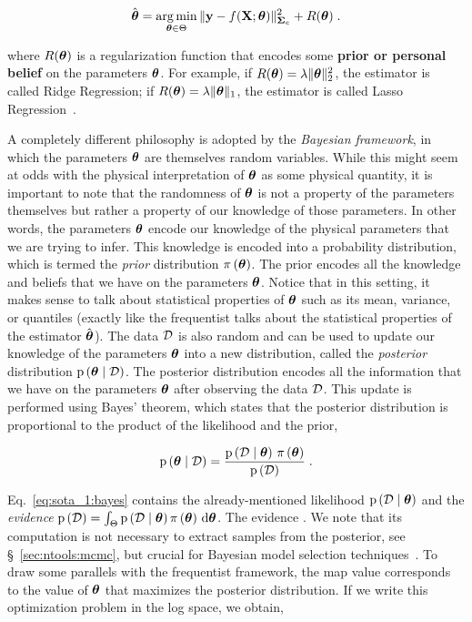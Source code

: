 \begin{equation}
    \hat{\boldsymbol{\theta}} = \operatorname*{arg\,min}_{\boldsymbol{\theta} \in \Theta} \|\mathbf{y} - f(\mathbf{X};\boldsymbol{\theta})\|_{\boldsymbol{\Sigma}_e}^2 + R(\boldsymbol{\theta}) \;.
    \label{eq:sota_1:regularized_ols}
\end{equation}

where $R(\boldsymbol{\theta})$ is a regularization function that encodes some \textbf{prior or personal belief} on the parameters $\boldsymbol{\theta}$. For example, if $R(\boldsymbol{\theta}) = \lambda \|\boldsymbol{\theta}\|_2^2$, the estimator is called Ridge Regression; if $R(\boldsymbol{\theta}) = \lambda \|\boldsymbol{\theta}\|_1$, the estimator is called Lasso Regression~\cite{BEDOUI2020106917}.

\bigskip
A completely different philosophy is adopted by the \textit{Bayesian framework}, in which the parameters $\boldsymbol{\theta}$ are themselves random variables. While this might seem at odds with the physical interpretation of $\boldsymbol{\theta}$ as some physical quantity, it is important to note that the randomness of $\boldsymbol{\theta}$ is not a property of the parameters themselves but rather a property of our knowledge of those parameters. In other words, the parameters $\boldsymbol{\theta}$ encode our knowledge of the physical parameters that we are trying to infer. This knowledge is encoded into a probability distribution, which is termed the \textit{prior} distribution $\pi \left( \boldsymbol{\theta}\right)$. The prior encodes all the knowledge and beliefs that we have on the parameters $\boldsymbol{\theta}$. Notice that in this setting, it makes sense to talk about statistical properties of $\boldsymbol{\theta}$ such as its mean, variance, or quantiles (exactly like the frequentist talks about the statistical properties of the estimator $\hat{\boldsymbol{\theta}}$). The data $\mathcal{D}$ is also random and can be used to update our knowledge of the parameters $\boldsymbol{\theta}$ into a new distribution, called the \textit{posterior} distribution $\mathrm{p} \left( \boldsymbol{\theta} \mid \mathcal{D} \right)$. The posterior distribution encodes all the information that we have on the parameters $\boldsymbol{\theta}$ after observing the data $\mathcal{D}$. This update is performed using Bayes' theorem, which states that the posterior distribution is proportional to the product of the likelihood and the prior,

\begin{equation}
    \mathrm{p} \left( \boldsymbol{\theta} \mid \mathcal{D} \right) = \dfrac{\mathrm{p} \left( \mathcal{D} \mid \boldsymbol{\theta} \right)\, \pi \left( \boldsymbol{\theta}\right)}{\mathrm{p} \left( \mathcal{D} \right)} \;.
    \label{eq:sota_1:bayes}
\end{equation}

Eq.~\eqref{eq:sota_1:bayes} contains the already-mentioned likelihood $\mathrm{p} \left( \mathcal{D} \mid \boldsymbol{\theta} \right)$ and the \textit{evidence} $\mathrm{p} \left( \mathcal{D} \right) = \int_{\Theta} \mathrm{p} \left( \mathcal{D} \mid \boldsymbol{\theta} \right) \pi \left( \boldsymbol{\theta}\right) \, \text{d}\boldsymbol{\theta}$. The evidence . We note that its computation is not necessary to extract samples from the posterior, see \S~\ref{sec:ntools:mcmc}, but  crucial for Bayesian model selection techniques~\cite{comp_stat,50_shades_of_bms}. To draw some parallels with the frequentist framework, the \gls{map} value corresponds to the value of $\boldsymbol{\theta}$ that maximizes the posterior distribution. If we write this optimization problem in the log space, we obtain,

